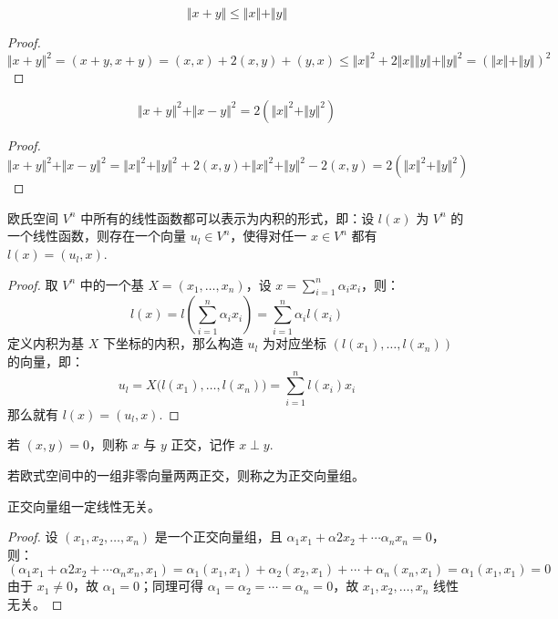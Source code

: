 \begin{theorem}[三角不等式]
\[
    \Vert x+y\Vert\leq \Vert x\Vert+\Vert y\Vert
\]
\end{theorem}
\begin{proof}
\[
    \Vert x+y\Vert^2=(x+y,x+y)=(x,x)+2(x,y)+(y,x)\leq \Vert x\Vert^2+2\Vert x\Vert\Vert y\Vert+\Vert y\Vert^2=(\Vert x\Vert+\Vert y\Vert)^2
\]
\end{proof}

\begin{theorem}[平行四边形恒等式]
\label{thm:parallelogram}
\[
    \Vert x+y\Vert^2+\Vert x-y\Vert^2=2(\Vert x\Vert^2+\Vert y\Vert^2)
\]
\end{theorem}
\begin{proof}
\[
    \Vert x+y\Vert^2+\Vert x-y\Vert^2=\Vert x\Vert^2+\Vert y\Vert^2+2(x,y)+\Vert x\Vert^2+\Vert y\Vert^2-2(x,y)=2(\Vert x\Vert^2+\Vert y\Vert ^2)
\]
\end{proof}

\begin{theorem}
欧氏空间 $V^n$ 中所有的线性函数都可以表示为内积的形式，即：设 $l(x)$ 为 $V^n$ 的一个线性函数，则存在一个向量 $u_l\in V^n$，使得对任一 $x\in V^n$ 都有 $l(x)=(u_l,x)$.
\end{theorem}
\begin{proof}
取 $V^n$ 中的一个基 $X=(x_1,\ldots,x_n)$，设 $x=\sum_{i=1}^n\alpha_ix_i$，则：
\[
    l(x)=l\left(\sum_{i=1}^n\alpha_ix_i\right)=\sum_{i=1}^n\alpha_i l(x_i)
\]
定义内积为基 $X$ 下坐标的内积，那么构造 $u_l$ 为对应坐标 $(l(x_1),\ldots,l(x_n))$ 的向量，即：
\[
    u_l=X\big(l(x_1),\ldots,l(x_n)\big)=\sum_{i=1}^nl(x_i)x_i
\]
那么就有 $l(x)=(u_l,x)$.
\end{proof}

\begin{definition}[正交]
若 $(x,y)=0$，则称 $x$ 与 $y$ 正交，记作 $x\perp y$.
\end{definition}
\begin{definition}[正交向量组]
若欧式空间中的一组非零向量两两正交，则称之为正交向量组。
\end{definition}

\begin{theorem}
\label{thm:perp-ind}
正交向量组一定线性无关。
\end{theorem}
\begin{proof}
设 $(x_1,x_2,\ldots,x_n)$ 是一个正交向量组，且 $\alpha_1x_1+\alpha2x_2+\cdots\alpha_nx_n=0$，则：
\[
    (\alpha_1x_1+\alpha2x_2+\cdots\alpha_nx_n,x_1)=\alpha_1(x_1,x_1)+\alpha_2(x_2,x_1)+\cdots+\alpha_n(x_n,x_1)=\alpha_1(x_1,x_1)=0
\]
由于 $x_1\neq 0$，故 $\alpha_1=0$；同理可得 $\alpha_1=\alpha_2=\cdots=\alpha_n=0$，故 $x_1,x_2,\ldots,x_n$ 线性无关。
\end{proof}

